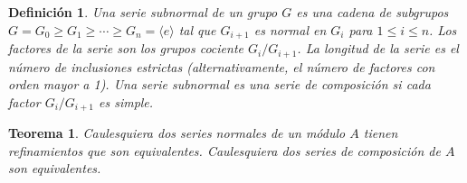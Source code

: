 \documentclass{report}
\newtheorem{theorem}{Teorema}
\newtheorem{definition}{Definición}
\begin{document}
  \begin{definition}
    Una \emph{serie subnormal} de un grupo \(G\) es una cadena de subgrupos \(G = G_0 \geq G_1 \geq \cdots \geq G_n = \langle e \rangle\) tal que \(G_{i + 1}\) es normal en \(G_i\) para \(1 \leq i \leq n\).
    Los \emph{factores} de la serie son los grupos cociente \(G_i / G_{i + 1}\).
    La \emph{longitud} de la serie es el número de inclusiones estrictas (alternativamente, el número de factores con orden mayor a 1).
    Una serie subnormal es una \emph{serie de composición} si cada factor \(G_i / G_{i + 1}\) es simple.
  \end{definition}

  \begin{theorem}
    Caulesquiera dos series normales de un módulo \(A\) tienen refinamientos que son equivalentes.
    Caulesquiera dos series de composición de \(A\) son equivalentes.
  \end{theorem}
\end{document}
